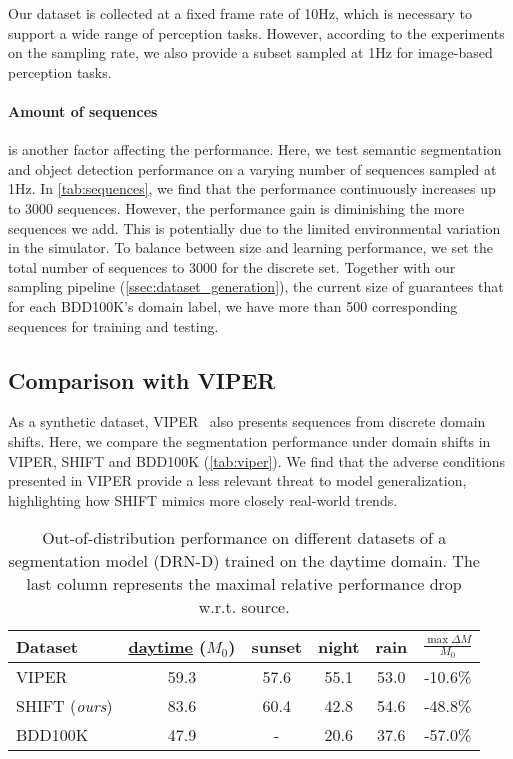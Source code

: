 Our dataset is collected at a fixed frame rate of 10Hz, which is necessary to support a wide range of perception tasks.  
However, according to the experiments on the sampling rate, we also provide a subset sampled at 1Hz for image-based perception tasks.

\paragraph{Amount of sequences} is another factor affecting the performance. 
Here, we test semantic segmentation and object detection performance on a varying number of sequences sampled at 1Hz.
In \autoref{tab:sequences}, we find that the performance continuously increases up to 3000 sequences. 
However, the performance gain is diminishing the more sequences we add. This is potentially due to the limited environmental variation in the simulator. 
To balance between size and learning performance, we set the total number of sequences to 3000 for the discrete set. 
Together with our sampling pipeline (\autoref{ssec:dataset_generation}), the current size of \thedataset{} guarantees 
that for each BDD100K's domain label, we have more than 500 corresponding sequences for training and testing. 

\subsection{Comparison with VIPER} \label{sec:viper}
As a synthetic dataset, VIPER~\cite{Richter_2017} also presents sequences from discrete domain shifts. 
Here, we compare the segmentation performance under domain shifts in VIPER, SHIFT and BDD100K (\autoref{tab:viper}). We find that the adverse conditions presented in VIPER provide a less relevant threat to model generalization, highlighting how SHIFT mimics more closely real-world trends.

\begin{table}[!ht]
    \centering
    \footnotesize
    \setlength{\tabcolsep}{5pt}
    \begin{tabular}{l|cccc|c}
    \toprule
       \textbf{Dataset} & \underline{daytime} ($M_0$) & sunset & night & rain &  $\frac{\max{\Delta M}}{M_{0}}$ \\
       \midrule
        VIPER & 59.3 & 57.6 & 55.1 & 53.0  & -10.6\% \\
        SHIFT (\textit{ours})  & 83.6 & 60.4 & 42.8 & 54.6 & -48.8\% \\ \midrule
        BDD100K & 47.9 & - & 20.6 & 37.6  &  -57.0\% \\
        \bottomrule
    \end{tabular}
    \caption{\footnotesize{Out-of-distribution performance on different datasets of a segmentation model (DRN-D) trained on the daytime domain. The last column represents the maximal relative performance drop w.r.t. source.}}
    \label{tab:viper}
    \vspace{-1em}
\end{table}
